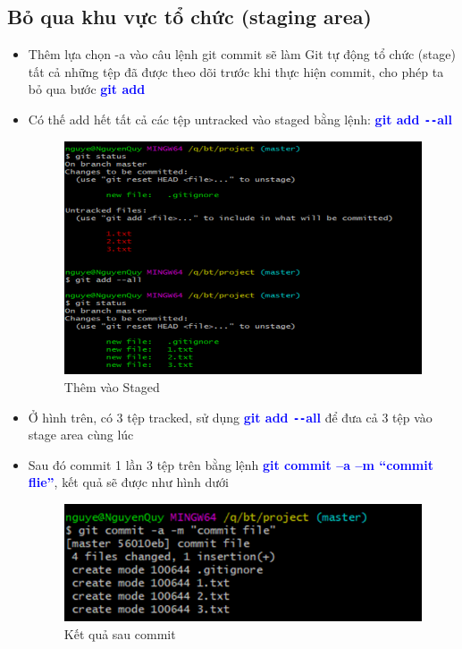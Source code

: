 \documentclass[12pt,a4paper]{report}
\begin{document}
\subsection{Bỏ qua khu vực tổ chức (staging area)}
\begin{itemize}
\item Thêm lựa chọn -a vào câu lệnh git commit sẽ làm Git tự động tổ chức (stage) tất cả những tệp đã được theo dõi trước khi thực hiện commit, cho phép ta bỏ qua bước \textcolor{blue}{\bf git add}
\item Có thế add hết tất cả các tệp untracked vào staged bằng lệnh: \textcolor{blue}{\bf git add \texttt{-{}-}all}

\begin{figure}[!ht]
	\centering
	\includegraphics[width=0.8\linewidth]{screenshot013}
\caption{Thêm vào Staged}
	\label{fig:screenshot013}
\end{figure}

\item Ở hình trên, có 3 tệp tracked, sử dụng \textcolor{blue}{\bf git add \texttt{-{}-}all} để đưa cả 3 tệp vào stage area cùng lúc
\item Sau đó commit 1 lần 3 tệp trên bằng lệnh \textcolor{blue}{\bf git commit –a –m “commit flie”}, kết quả sẽ được như hình dưới

\begin{figure}[!ht]
	\centering
	\includegraphics[width=0.8\linewidth]{screenshot014}
\caption{Kết quả sau commit}
	\label{fig:screenshot014}
	\end{figure}	
\end{itemize}
\end{document}

